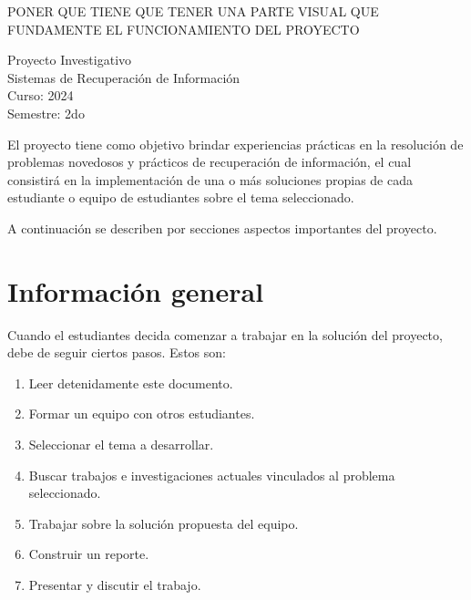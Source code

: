 \documentclass[10pt]{article}
\date{\displaydate{date}}
\begin{document}
	
	
	\begin{centering}
		
			PONER QUE TIENE QUE TENER UNA PARTE VISUAL QUE FUNDAMENTE EL FUNCIONAMIENTO DEL PROYECTO
			
			
		\huge Proyecto Investigativo \\[2mm]
		
		\small Sistemas de Recuperación de Información\\
		Curso: 2024\\
		Semestre: 2do
		
	\end{centering}
	
	\vspace{2mm}
	
	El proyecto tiene como objetivo brindar experiencias prácticas en la resolución de problemas novedosos y prácticos de recuperación de información, el cual consistirá en la implementación de una o más soluciones propias de cada estudiante o equipo de estudiantes sobre el tema seleccionado.
	
	A continuación se describen por secciones aspectos importantes del proyecto.
	
	\section*{Información general}
	
		Cuando el estudiantes decida comenzar a trabajar en la solución del proyecto, debe de seguir ciertos pasos. Estos son:
		\begin{enumerate}
			\item Leer detenidamente este documento.
			\item Formar un equipo con otros estudiantes.
			\item Seleccionar el tema a desarrollar.
			\item Buscar trabajos e investigaciones actuales vinculados al problema seleccionado.
			\item Trabajar sobre la solución propuesta del equipo.
			\item Construir un reporte.
			\item Presentar y discutir el trabajo.
			
		\end{enumerate}
	
\end{document}
